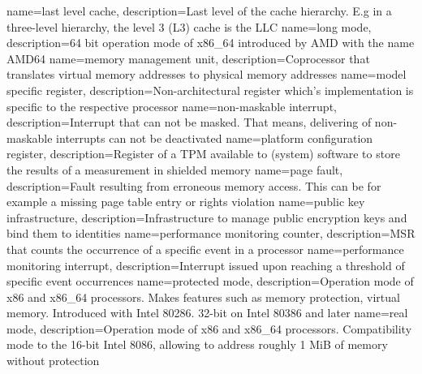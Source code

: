 {
    name=last level cache,
    description={Last level of the cache hierarchy. E.g in a three-level hierarchy, the level 3 (L3) cache is the LLC}
}
{
    name=long mode,
    description={64 bit operation mode of x86\_64 introduced by AMD with the name AMD64}
}
%
{
    name=memory management unit,
    description={Coprocessor that translates virtual memory addresses to physical memory addresses}
}
{
    name=model specific register,
    description={Non-architectural register which's implementation is specific to the respective processor}
}
%
{
    name=non-maskable interrupt,
    description={Interrupt that can not be masked. That means, delivering of non-maskable interrupts can not be
            deactivated}
}
%
{
    name=platform configuration register,
    description={Register of a TPM available to (system) software to store the results of a measurement in shielded
            memory}
}
{
    name=page fault,
    description={Fault resulting from erroneous memory access. This can be for example a missing page table entry or
            rights violation}
}
{
    name=public key infrastructure,
    description={Infrastructure to manage public encryption keys and bind them to identities}
}
{
    name=performance monitoring counter,
    description={MSR that counts the occurrence of a specific event in a processor}
}
{
    name=performance monitoring interrupt,
    description={Interrupt issued upon reaching a threshold of specific event occurrences}
}
{
    name=protected mode,
    description={Operation mode of x86 and x86\_64 processors. Makes features such as memory protection, virtual memory.
            Introduced with Intel 80286. 32-bit on Intel 80386 and later}
}
%
{
    name=real mode,
    description={Operation mode of x86 and x86\_64 processors. Compatibility mode to the 16-bit Intel 8086, allowing to
            address roughly 1 MiB of memory without protection}
}
